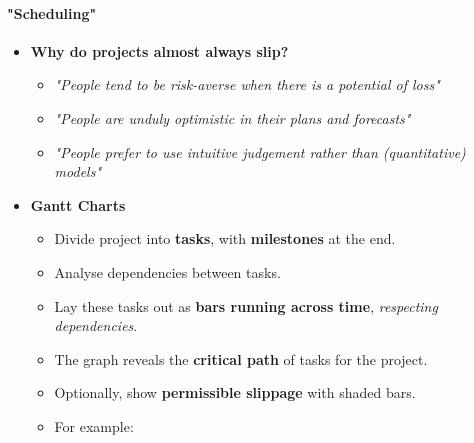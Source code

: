 \documentclass[a4paper]{article}
\providecommand{\tightlist}{%
  \setlength{\itemsep}{0pt}\setlength{\parskip}{0pt}}
\let\oldparagraph\paragraph
\renewcommand{\paragraph}[1]{\oldparagraph{#1}\mbox{}}
\begin{document}
\hypertarget{scheduling}{%
\paragraph{"Scheduling"}\label{scheduling}}

\begin{itemize}
\item
  \textbf{Why do projects almost always slip?}

  \begin{itemize}
  \tightlist
  \item
    \emph{"People tend to be risk-averse when there is a potential of
    loss"}
  \item
    \emph{"People are unduly optimistic in their plans and forecasts"}
  \item
    \emph{"People prefer to use intuitive judgement rather than
    (quantitative) models"}
  \end{itemize}
\item
  \textbf{Gantt Charts}

  \begin{itemize}
  \tightlist
  \item
    Divide project into \textbf{tasks}, with \textbf{milestones} at the
    end.
  \item
    Analyse dependencies between tasks.
  \item
    Lay these tasks out as \textbf{bars running across time},
    \emph{respecting dependencies}.
  \item
    The graph reveals the \textbf{critical path} of tasks for the
    project.
  \item
    Optionally, show \textbf{permissible slippage} with shaded bars.
  \item
    For example:


\end{itemize}
\end{itemize}
\end{document}
